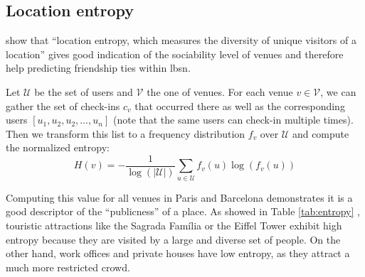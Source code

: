 \subsection{Location entropy}

\Textcite{Entropy10} show that \enquote{location entropy, which measures the
diversity of unique visitors of a location} gives good indication of the
sociability level of venues and therefore help predicting friendship ties within
\gls{lbsn}.

Let $\mathcal{U}$ be the set of users and $\mathcal{V}$ the one of venues. For
each venue $v \in \mathcal{V}$, we can gather the set of check-ins $c_v$ that
occurred there as well as the corresponding users $[u_1, u_2, u_2, \ldots,
u_n]$ (note that the same users can check-in multiple times). Then we
transform this list to a frequency distribution $f_v$ over $\mathcal{U}$ and
compute the normalized entropy: \[
    H(v) = -\frac{1}{\log\left(\left| \mathcal{U}\right|\right)}
\sum_{u\in \mathcal{U}} f_v(u) \log(f_v(u)) \]

Computing this value for all venues in Paris and Barcelona demonstrates it is a
good descriptor of the \enquote{publicness} of a place. As showed in
Table \ref{tab:entropy} , touristic attractions like the Sagrada Família or the
Eiffel Tower exhibit high entropy because they are visited by a large and
diverse set of people. On the other hand, work offices and private houses have
low entropy, as they attract a much more restricted crowd.

